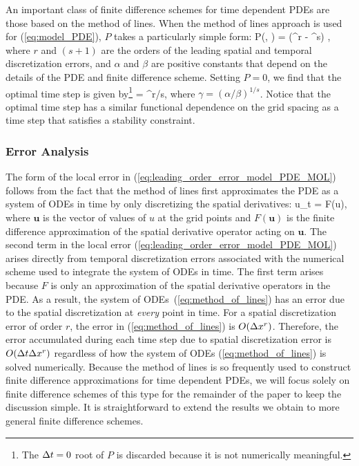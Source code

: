 \documentclass[oneeqnum,onefignum,onetabnum,onethmnum]{siamltex}
\begin{document}
An important class of finite difference schemes for time dependent PDEs are 
those based on the method of lines.   When the method of lines approach is 
used for (\ref{eq:model_PDE}), $P$ takes a particularly simple 
form:
\beq
  P(\dx, \dt) = (\alpha \dx^r - \beta \dt^s) \dt,
  \label{eq:leading_order_error_model_PDE_MOL}
\eeq
where $r$ and $(s+1)$ are the orders of the leading spatial and temporal 
discretization errors, and $\alpha$ and $\beta$ are positive constants that 
depend on the details of the PDE and finite difference scheme.  Setting 
$P = 0$, we find that the optimal time step is given by\footnote{The $\Delta t = 0$ 
root of $P$ is discarded because it is not numerically meaningful.}
\beq
  \dto = \gamma \dx^{r/s},
  \label{eq:optimal_time_step}
\eeq
where $\gamma = (\alpha/\beta)^{1/s}$.  Notice that the optimal time step 
has a similar functional dependence on the grid spacing as a time step that 
satisfies a stability constraint.  


\subsubsection*{\label{sec:error_analysis} 
            Error Analysis}
The form of the local error in 
(\ref{eq:leading_order_error_model_PDE_MOL}) follows from the fact 
that the method of lines first approximates the PDE as a system of ODEs in 
time by only discretizing the spatial derivatives: 
\beq
{\mathbf u}_t = F({\mathbf u}),
\label{eq:method_of_lines}
\eeq
where ${\mathbf u}$ is the vector of values of $u$ at the grid points and
$F({\mathbf u})$ is the finite difference approximation of the spatial 
derivative operator acting on ${\mathbf u}$.  The second term in the local 
error (\ref{eq:leading_order_error_model_PDE_MOL}) arises directly from 
temporal discretization errors associated with the numerical scheme used to 
integrate the system of ODEs in time.  The first term arises because $F$ is 
only an approximation of the spatial derivative operators in the PDE.  As a 
result, the system of ODEs~(\ref{eq:method_of_lines}) has an error due to 
the spatial discretization at \emph{every} point in time.  For a spatial 
discretization error of order $r$, the error in (\ref{eq:method_of_lines}) is 
$O(\Delta x^r)$.  Therefore, the error accumulated during each time step due to 
spatial discretization error is $O(\Delta t \Delta x^r)$ regardless of how the system of 
ODEs (\ref{eq:method_of_lines}) is solved numerically.  Because the method of 
lines is so frequently used to construct finite difference approximations for 
time dependent PDEs, we will focus solely on finite difference schemes of this 
type for the remainder of the paper to keep the discussion simple.  It is 
straightforward to extend the results we obtain to more general finite 
difference schemes. 
\end{document}
